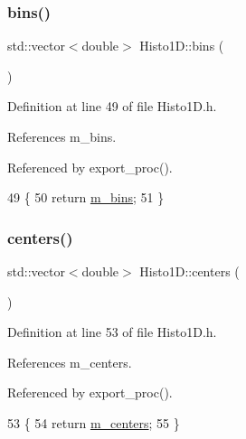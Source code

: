 \subsubsection{\texorpdfstring{bins()}{bins()}}
{\footnotesize\ttfamily std\+::vector$<$double$>$ Histo1\+D\+::bins (\begin{DoxyParamCaption}{ }\end{DoxyParamCaption})\hspace{0.3cm}{\ttfamily [inline]}}



Definition at line 49 of file Histo1\+D.\+h.



References m\+\_\+bins.



Referenced by export\+\_\+proc().


\begin{DoxyCode}
49                           \{  
50     \textcolor{keywordflow}{return} \hyperlink{classHisto1D_a7a82923d3938739904469f5aa0a517ca}{m\_bins};
51   \}
\end{DoxyCode}
\mbox{\label{classHisto1D_a07fd41679a3255cdd44d4dcf8865adb7}} 
\subsubsection{\texorpdfstring{centers()}{centers()}}
{\footnotesize\ttfamily std\+::vector$<$double$>$ Histo1\+D\+::centers (\begin{DoxyParamCaption}{ }\end{DoxyParamCaption})\hspace{0.3cm}{\ttfamily [inline]}}



Definition at line 53 of file Histo1\+D.\+h.



References m\+\_\+centers.



Referenced by export\+\_\+proc().


\begin{DoxyCode}
53                              \{  
54     \textcolor{keywordflow}{return} \hyperlink{classHisto1D_a0e03676ed176aaad2f615fa84b8ffcd3}{m\_centers};
55   \}
\end{DoxyCode}
\mbox{\label{classHisto1D_a22b820e2c706d8e8614c31962f1ac6d0}} 
